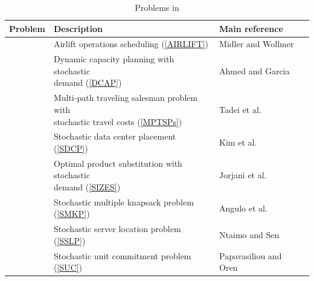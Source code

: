 \begin{table}[H]
	\centering
			\caption{Problems in \siplibtwo}
			\label{table:problems}
			\begin{tabular}{@{}llll@{}}
				\toprule
				Problem		  		  & Description                                                        & Main reference              \\ \midrule
				\airlift\ & Airlift operations scheduling (\ref{AIRLIFT}) & Midler and Wollmer \cite{journal:MW1969} \\
				\dcap\         & \makecell[tl]{Dynamic capacity planning with stochastic\\ demand (\ref{DCAP}) }                  & Ahmed and Garcia \cite{journal:AG2004}                          \\
				\mptsps\       & \makecell[tl]{Multi-path traveling salesman problem with\\ stochastic travel costs (\ref{MPTSPs})}& Tadei et al. \cite{journal:TPP2017}                            \\
				\sdcp\ 	& Stochastic data center placement (\ref{SDCP}) & Kim et al. \cite{journal:KYZC2017}\\
				\sizes\        & \makecell[tl]{Optimal product substitution with stochastic\\ demand (\ref{SIZES})}         & Jorjani et al. \cite{journal:JSW1999}          \\
				\smkp\		  & Stochastic multiple knapsack problem (\ref{SMKP})                              & Angulo et al. \cite{journal:AAD2014}                            \\
				\sslp\         & Stochastic server location problem (\ref{SSLP})                                & Ntaimo and Sen \cite{journal:NS2005}                           \\
				\suc\         & Stochastic unit commitment problem	(\ref{SUC})			               & Papavasiliou and Oren \cite{journal:PO2013}                       \\ \bottomrule
			\end{tabular}%
			
\end{table}

